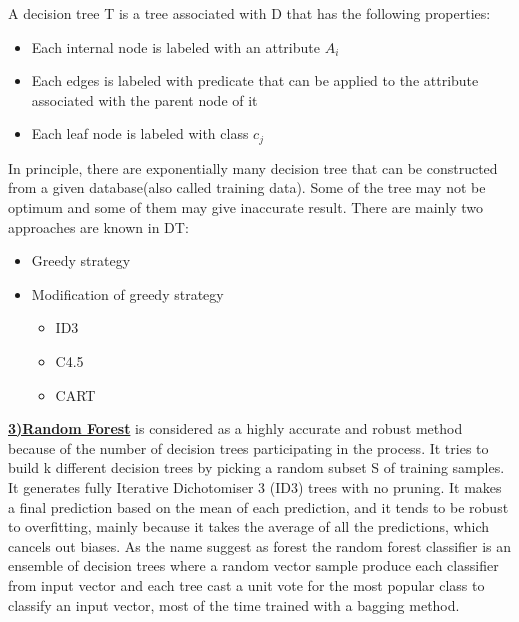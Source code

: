 \documentclass[11pt]{article}
\begin{document}
A decision tree T is a tree associated with D that has the following properties:
\begin{itemize}
\item Each internal node is labeled with an attribute $A_{i}$
\item Each edges is labeled with predicate that can be applied to the attribute
associated with the parent node of it
\item Each leaf node is labeled with class $c_{j}$
\end{itemize}
In principle, there are exponentially many decision tree that can be constructed from a given database(also called training data). Some of the tree may not be optimum and some of them may give inaccurate result. There are mainly two approaches are known in DT:
\begin{itemize}
\vspace{-0.3cm}
\item Greedy strategy
\vspace{-0.5cm}
\item Modification of greedy strategy
\vspace{-0.3cm}
\begin{itemize}
\vspace{-0.3cm}
\item ID3
\vspace{-0.3cm}
\item C4.5
\vspace{-0.3cm}
\item CART
\vspace{-0.3cm}

\end{itemize}
\end{itemize}
\underline{\textbf{3)Random Forest}} is considered as a highly accurate and robust method because of
the number of decision trees participating in the process. It tries to build k different decision trees by picking a random subset S of training samples. It generates fully Iterative
Dichotomiser 3 (ID3) trees with no pruning. It makes a final prediction based on the mean of each prediction, and it tends to be robust to overfitting, mainly because it takes the average of all the predictions, which cancels out biases. As the name suggest as forest the random forest classifier is an ensemble of decision trees where a random vector sample produce each classifier from input vector  and each tree cast 
a unit vote for the most popular class to classify an input vector, most of the time trained with a bagging 
method.\\
\end{document}
